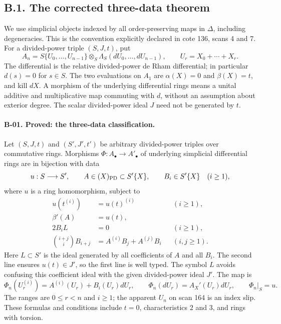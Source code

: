 \subsection{B.1. The corrected three-data theorem}

We use simplicial objects indexed by all order-preserving maps in $\Delta$,
including degeneracies. This is the convention explicitly declared in cote
136, scans 4 and 7. For a divided-power triple $(S,J,t)$, put
\[
 A_n=S\{U_0,\ldots,U_{n-1}\}\otimes_S
       \Lambda_S(dU_0,\ldots,dU_{n-1}),\qquad U_r=X_0+\cdots+X_r.
\]
The differential is the relative divided-power de Rham differential; in
particular $d(s)=0$ for $s\in S$. The two evaluations on $A_1$ are
$\alpha(X)=0$ and $\beta(X)=t$, and kill $dX$. A morphism of the
underlying differential rings means a unital additive and multiplicative
map commuting with $d$, without an assumption about exterior degree.
The scalar divided-power ideal $J$ need not be generated by $t$.

\paragraph{B-01. Proved: the three-data classification.}
Let $(S,J,t)$ and $(S',J',t')$ be arbitrary divided-power triples over
commutative rings. Morphisms $\Phi:A_\bullet\to A'_\bullet$ of underlying
simplicial differential rings are in bijection with data
\[
 u:S\longrightarrow S',\qquad A\in (X)_{\rm PD}\subset S'\{X\},
 \qquad B_i\in S'\{X\}\quad(i\geq1),
\]
where $u$ is a ring homomorphism, subject to
\begin{align*}
 u(t^{(i)})&=u(t)^{(i)} &&(i\geq1),\\
 \beta'(A)&=u(t),\\
 2B_i L&=0 &&(i\geq1),\\
 \binom{i+j}{i}B_{i+j}&=A^{(i)}B_j+A^{(j)}B_i &&(i,j\geq1).
 \tag{B-M}
\end{align*}
Here $L\subset S'$ is the ideal generated by all coefficients of $A$
and all $B_i$. The second line ensures $u(t)\in J'$, so the first line
is well typed. The symbol $L$ avoids confusing this coefficient ideal
with the given divided-power ideal $J'$.
The map is
\[
 \Phi_n(U_r^{(i)})=A^{(i)}(U_r)+B_i(U_r)dU_r,
 \qquad \Phi_n(dU_r)=A_X'(U_r)dU_r,
 \qquad \Phi_n|_S=u.
 \tag{B-1}
\]
The ranges are $0\leq r<n$ and $i\geq1$; the apparent $U_n$ on scan
164 is an index slip. These formulas and conditions include $t=0$,
characteristics $2$ and $3$, and rings with torsion.

